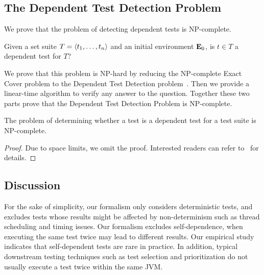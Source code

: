 \subsection{The Dependent Test Detection Problem}

We prove that the problem of detecting dependent tests
 is NP-complete.


\begin{definition}
Given a set suite\/ $T =  \langle t_1, \dots, t_n \rangle $ and an initial environment\/
$\mathbf{E}_0$, is $t \in T$ a dependent test for $T$?
\end{definition}

We prove that this problem is NP-hard by reducing the NP-complete Exact Cover problem
to the Dependent Test Detection
problem~\cite{karp:NP:1972}. 
Then we provide a linear-time algorithm to verify any answer to the
question.
Together these two parts prove that the Dependent Test Detection Problem is NP-complete.

\begin{theorem}
The problem of determining whether a test is a dependent test for
a test suite is NP-complete.
\end{theorem}

\begin{proof}
Due to space limits, we omit the proof. Interested
readers can refer to~\cite{testdependence} for details.
\end{proof}

%

\subsection{Discussion}
\label{sec:formaldiscussion}

For the sake of simplicity, our formalism only
considers deterministic tests,
and excludes tests whose results might be affected by
non-determinism such as thread scheduling
and timing issues.
Our formalism excludes self-dependence, 
when executing the same test twice
may lead to different results. Our empirical study
indicates that self-dependent tests
are rare in practice. In addition, typical
downstream testing techniques such as test selection and
prioritization do not usually execute a test twice within the same JVM\@.



